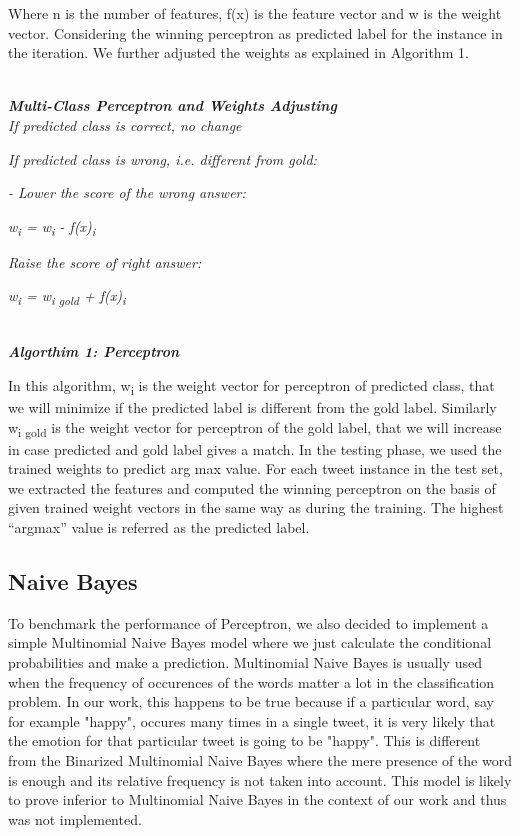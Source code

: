 \documentclass[11pt]{article}
\begin{document}
  Where n is the number of features, f(x) is the feature vector and w is the weight vector. Considering the winning perceptron as predicted label for the instance in the iteration. We further adjusted the weights as explained in Algorithm 1.
  
  \noindent\hrulefill\\
   \textbf{\emph {Multi-Class Perceptron and Weights Adjusting}} \\
  
  \emph{ If predicted class is correct, no change}
  
  \emph{If predicted class is wrong, i.e. different from gold:}
  
  \emph{- Lower the score of the wrong answer:}
  
  \emph{w\textsubscript{i} = w\textsubscript{i} - f(x)\textsubscript{i}}
  
  \emph{Raise the score of right answer:}
  
  \emph{w\textsubscript{i} = w\textsubscript{i gold} + f(x)\textsubscript{i} }
  
  \noindent\hrulefill\\
  \textbf{\emph{ Algorthim 1: Perceptron }}
  
  In this algorithm, w\textsubscript{i} is the weight vector for perceptron of predicted class, that we will minimize if the predicted label is different from the gold label. Similarly w\textsubscript{i gold} is the weight vector for perceptron of the gold label, that we will increase in case predicted and gold label gives a match.
  In the testing phase, we used the trained weights to predict arg max value. For each tweet instance in the test set, we extracted the features and computed the
  winning perceptron on the basis of given trained weight vectors in the same way as during the training. The highest “argmax” value is referred as the
  predicted label.\\
  
  \subsection{Naive Bayes}
   To benchmark the performance of Perceptron, we also decided to implement a simple Multinomial Naive Bayes model where we just calculate the conditional probabilities and make a prediction. Multinomial Naive Bayes is usually used when the frequency of occurences of the words matter a lot in the classification problem. In our work, this happens to be true because if a particular word, say for example "happy", occures many times in a single tweet, it is very likely that the emotion for that particular tweet is going to be "happy". This is different from the Binarized Multinomial Naive Bayes where the mere presence of the word is enough and its relative frequency is not taken into account. This model is likely to prove inferior to Multinomial Naive Bayes in the context of our work and thus was not implemented.
  
\end{document}
